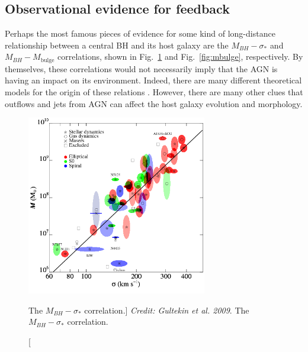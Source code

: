 \subsection{Observational evidence for feedback}
Perhaps the most famous pieces of evidence for some kind of long-distance 
relationship between a central BH and its host galaxy are the 
$M_{BH}-\sigma_*$ \citep{ferrarese2000,gebhardt2000,gultekin2009} and $M_{BH}-M_{\mathrm{bulge}}$ 
\citep{magorrian1998,haring2004,mcconnell2013} correlations, 
shown in Fig.~\ref{fig:msigma} and Fig.~\ref{fig:mbulge}, respectively.
By themselves, these correlations would not necessarily imply
that the AGN is having an impact on its environment. Indeed, there are many different
theoretical models for the origin of these relations 
\citep[e.g][]{somerville2001,adams2001,burkert2001,king2003,croton2006,kormendy2013}. 
However, there are many other clues that outflows and jets from AGN can affect
the host galaxy evolution and morphology.

\begin{figure}
\centering
\includegraphics[width=0.7\textwidth]{figures/02-outflows/msigma.png}
\caption
[The $M_{BH}-\sigma_*$ correlation.]
{
{\sl Credit: Gultekin et al. 2009}. 
The $M_{BH}-\sigma_*$ correlation.
} 
\label{fig:msigma}
\end{figure}

